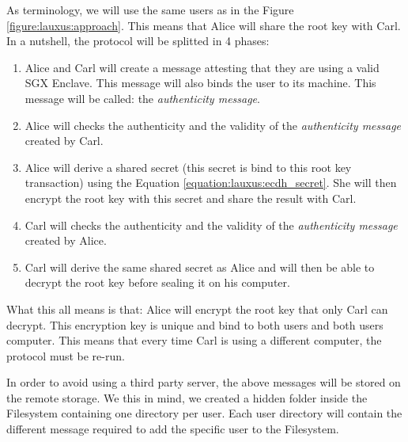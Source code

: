 \documentclass[../main.tex]{subfiles}
\begin{document}
\medbreak
\par As terminology, we will use the same users as in the Figure \ref{figure:lauxus:approach}. This means that Alice will share the root key with Carl. In a nutshell, the protocol will be splitted in 4 phases:
\begin{enumerate}
    \item Alice and Carl will create a message attesting that they are using a valid SGX Enclave. This message will also binds the user to its machine. This message will be called: the \textit{authenticity message}.
    \item Alice will checks the authenticity and the validity of the \textit{authenticity message} created by Carl.
    \item Alice will derive a shared secret (this secret is bind to this root key transaction) using the Equation \ref{equation:lauxus:ecdh_secret}. She will then encrypt the root key with this secret and share the result with Carl.
    \item Carl will checks the authenticity and the validity of the \textit{authenticity message} created by Alice.
    \item Carl will derive the same shared secret as Alice and will then be able to decrypt the root key before sealing it on his computer.
\end{enumerate}
\par What this all means is that: Alice will encrypt the root key that only Carl can decrypt. This encryption key is unique and bind to both users and both users computer. This means that every time Carl is using a different computer, the protocol must be re-run.
\par In order to avoid using a third party server, the above messages will be stored on the remote storage. We this in mind, we created a hidden folder inside the Filesystem containing one directory per user. Each user directory will contain the different message required to add the specific user to the Filesystem.
\end{document}
